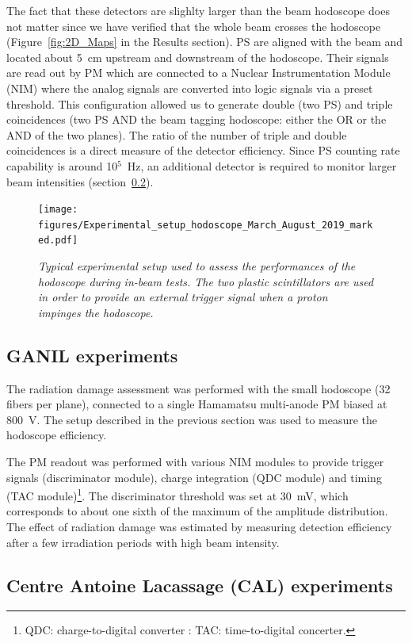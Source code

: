 \documentclass[a4paper,11pt]{article}
\begin{document}
The fact that these detectors are slighlty larger than the beam hodoscope does not matter since we have verified that the whole beam crosses the hodoscope (Figure~\ref{fig:2D_Maps} in the Results section). PS are aligned with the beam and located about 5~cm upstream and downstream of the hodoscope. Their signals are read out by PM which are connected to a Nuclear Instrumentation Module (NIM) where the analog signals are converted into logic signals via a preset threshold. This configuration allowed us to generate double (two PS) and triple coincidences (two PS AND the beam tagging hodoscope: either the OR or the AND of the two planes). The ratio of the number of triple and double coincidences is a direct measure of the detector efficiency. Since PS counting rate capability is around {10}$^{5}$~Hz, an additional detector is required to monitor larger beam intensities (section~\ref{In-beam_tests}).

\begin{figure}[htb]
\centering
\texttt{[image: figures/Experimental\_setup\_hodoscope\_March\_August\_2019\_marked.pdf]}
\caption{\small{\textit{Typical experimental setup used to assess the performances of the hodoscope during in-beam tests. The two plastic scintillators are used in order to provide an external trigger signal when a proton impinges the hodoscope.}}}
\label{fig:Picture_Setup_hodo}
\end{figure}


\subsection{GANIL experiments}

The radiation damage assessment was performed with the small hodoscope (32 fibers per plane), connected to a single Hamamatsu multi-anode PM biased at 800~V. The setup described in the previous section was used to measure the hodoscope efficiency.  

The PM readout was performed with various NIM modules to provide trigger signals (discriminator module), charge integration (QDC module) and timing (TAC module)\footnote{QDC: charge-to-digital converter : TAC: time-to-digital concerter.}. The discriminator threshold was set at 30~mV, which corresponds to about one sixth of the maximum of the amplitude distribution. The effect of radiation damage was estimated by measuring detection efficiency after a few irradiation periods with high beam intensity.

\subsection{Centre Antoine Lacassage (CAL) experiments}
\label{In-beam_tests}
\end{document}
